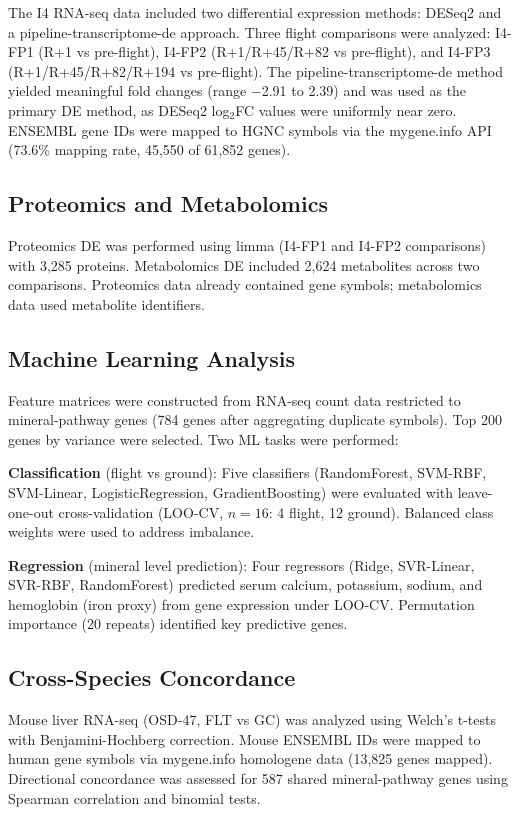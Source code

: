 \documentclass[11pt,a4paper]{article}
\begin{document}
The I4 RNA-seq data included two differential expression methods: DESeq2 and a pipeline-transcriptome-de approach. Three flight comparisons were analyzed: I4-FP1 (R+1 vs pre-flight), I4-FP2 (R+1/R+45/R+82 vs pre-flight), and I4-FP3 (R+1/R+45/R+82/R+194 vs pre-flight). The pipeline-transcriptome-de method yielded meaningful fold changes (range $-$2.91 to 2.39) and was used as the primary DE method, as DESeq2 log$_2$FC values were uniformly near zero. ENSEMBL gene IDs were mapped to HGNC symbols via the mygene.info API (73.6\% mapping rate, 45,550 of 61,852 genes).

\subsection{Proteomics and Metabolomics}

Proteomics DE was performed using limma (I4-FP1 and I4-FP2 comparisons) with 3,285 proteins. Metabolomics DE included 2,624 metabolites across two comparisons. Proteomics data already contained gene symbols; metabolomics data used metabolite identifiers.

\subsection{Machine Learning Analysis}

Feature matrices were constructed from RNA-seq count data restricted to mineral-pathway genes (784 genes after aggregating duplicate symbols). Top 200 genes by variance were selected. Two ML tasks were performed:

\textbf{Classification} (flight vs ground): Five classifiers (RandomForest, SVM-RBF, SVM-Linear, LogisticRegression, GradientBoosting) were evaluated with leave-one-out cross-validation (LOO-CV, $n=16$: 4 flight, 12 ground). Balanced class weights were used to address imbalance.

\textbf{Regression} (mineral level prediction): Four regressors (Ridge, SVR-Linear, SVR-RBF, RandomForest) predicted serum calcium, potassium, sodium, and hemoglobin (iron proxy) from gene expression under LOO-CV. Permutation importance (20 repeats) identified key predictive genes.

\subsection{Cross-Species Concordance}

Mouse liver RNA-seq (OSD-47, FLT vs GC) was analyzed using Welch's t-tests with Benjamini-Hochberg correction. Mouse ENSEMBL IDs were mapped to human gene symbols via mygene.info homologene data (13,825 genes mapped). Directional concordance was assessed for 587 shared mineral-pathway genes using Spearman correlation and binomial tests.
\end{document}
